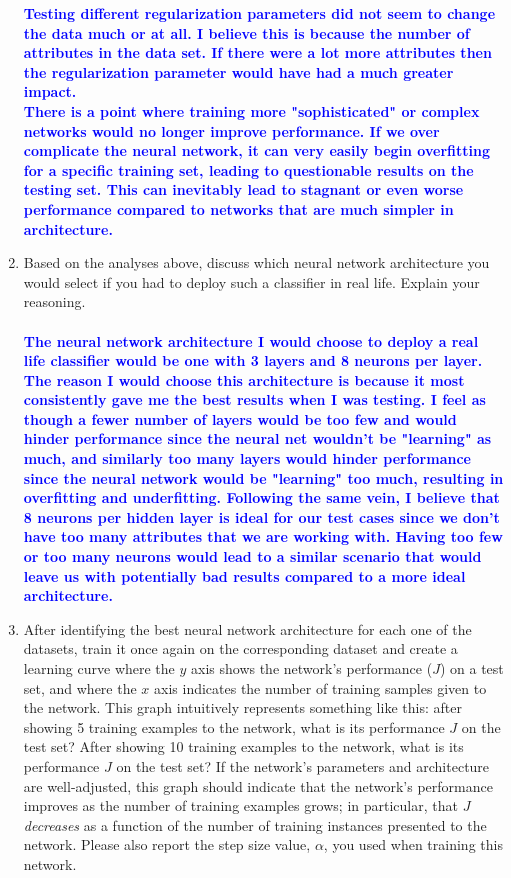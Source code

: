 \documentclass[letterpaper]{article}
\newcommand{\HIGHLIGHT}[1]{\textcolor{blue}{\textbf{#1}}}
\begin{document}
\begin{enumerate}
\HIGHLIGHT{Testing different regularization parameters did not seem to change the data much or at all. I believe this is because the number of attributes in the data set. If there were a lot more attributes then the regularization parameter would have had a much greater impact.} \\

\HIGHLIGHT{There is a point where training more "sophisticated" or complex networks would no longer improve performance. If we over complicate the neural network, it can very easily begin overfitting for a specific training set, leading to questionable results on the testing set. This can inevitably lead to stagnant or even worse performance compared to networks that are much simpler in architecture.} \\

    
    \item Based on the analyses above,  discuss which neural network architecture you would select if you had to deploy such a classifier in real life. Explain your reasoning. \\ \\
    
    
\HIGHLIGHT{The neural network architecture I would choose to deploy a real life classifier would be one with 3 layers and 8 neurons per layer. The reason I would choose this architecture is because it most consistently gave me the best results when I was testing. I feel as though a fewer number of layers would be too few and would hinder performance since the neural net wouldn't be "learning" as much, and similarly too many layers would hinder performance since the neural network would be "learning" too much, resulting in overfitting and underfitting. Following the same vein, I believe that 8 neurons per hidden layer is ideal for our test cases since we don't have too many attributes that we are working with. Having too few or too many neurons would lead to a similar scenario that would leave us with potentially bad results compared to a more ideal architecture.} \\
   
    
    \item After identifying the best neural network architecture for each one of the datasets, train it once again on the corresponding dataset and create a learning curve where the $y$ axis shows the network's performance ($J$) on a test set, and where the $x$ axis indicates the number of training samples given to the network. This graph intuitively represents something like this: after showing 5 training examples to the network, what is its performance $J$ on the test set? After showing 10 training examples to the network, what is its performance $J$ on the test set? If the network's parameters and architecture are well-adjusted, this graph should indicate that the network's performance improves as the number of training examples grows; in particular, that $J$ \textit{decreases} as a function of the number of training instances presented to the network. Please also report the step size value, $\alpha$, you used when training this network. \\
    

\end{enumerate}
\end{document}
